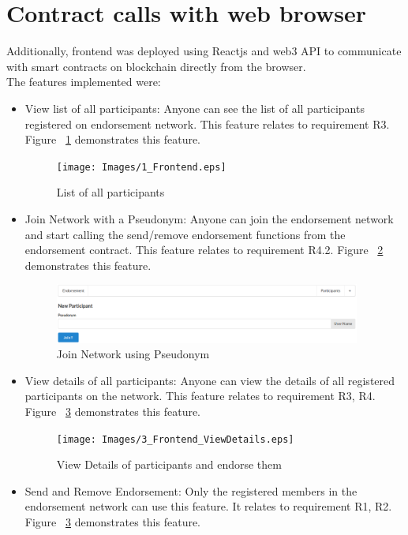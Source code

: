 \section{Contract calls with web browser}
Additionally, frontend was deployed using Reactjs and web3 API to communicate
with smart contracts on blockchain directly from the browser. \\
The features implemented were: \\
\begin{itemize}
	\item View list of all participants: Anyone can see the list of all
	participants registered on endorsement network. This feature relates to
	requirement R3. Figure ~\ref{listall} demonstrates this feature.   
	\begin{figure}[h]
		\texttt{[image: Images/1\_Frontend.eps]} 
		\caption{List of all participants} 
		\label{listall}
	\end{figure}
	\item Join Network with a Pseudonym: Anyone can join the endorsement
	network and start calling the send/remove endorsement functions from the
	endorsement contract. This feature relates to requirement R4.2. Figure ~\ref{joinNetwork} demonstrates this feature. 
	\begin{figure}[h]
		\includegraphics[width=0.95\textwidth]{Images/2_Frontend_JoinNetwork.eps} 
		\caption{Join Network using Pseudonym} 
		\label{joinNetwork}
	\end{figure}
	\item View details of all participants: Anyone can view the details of all
	registered participants on the network. This feature relates to requirement
	R3, R4. Figure ~\ref{viewDetails} demonstrates this feature. 
		\begin{figure}[h]
		\texttt{[image: Images/3\_Frontend\_ViewDetails.eps]} 
		\caption{View Details of participants and endorse them} 
		\label{viewDetails}
	\end{figure}
	\item Send and Remove Endorsement: Only the registered members in the
	endorsement network can use this feature. It relates to requirement R1, R2. Figure ~\ref{viewDetails} demonstrates this feature. 
\end{itemize}

